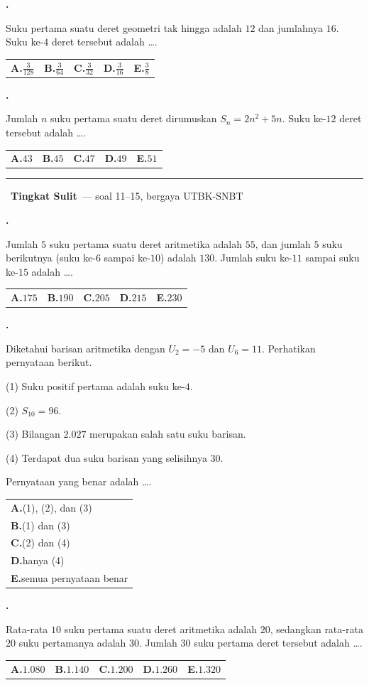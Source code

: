 \documentclass[a4paper,11pt]{article}
\newcommand{\dis}{\displaystyle}
\newcounter{no}
\newcommand{\tingkat}[2]{\par\Needspace{7\baselineskip}\vspace{0.6em}\noindent
  {\color{teal}\rule{3pt}{1.1em}}\ {\color{navy}\bfseries #1}\ {\small\color{gray}--- #2}\par\vspace{0.1em}}
\newcommand{\soal}[2]{\par\vspace{0.75em}\stepcounter{no}\noindent
  \begin{minipage}[t]{1.8em}\textbf{\theno.}\end{minipage}%
  \begin{minipage}[t]{\dimexpr\linewidth-1.8em\relax}#1\par\vspace{0.35em}#2\end{minipage}\par}
\begin{document}
\soal{Suku pertama suatu deret geometri tak hingga adalah $12$ dan jumlahnya $16$. Suku ke-$4$ deret tersebut adalah \dots.}{\begin{tabularx}{\linewidth}{@{}*{5}{X}@{}}\textbf{A.}\;$\dis\frac{3}{128}$ & \textbf{B.}\;$\dis\frac{3}{64}$ & \textbf{C.}\;$\dis\frac{3}{32}$ & \textbf{D.}\;$\dis\frac{3}{16}$ & \textbf{E.}\;$\dis\frac{3}{8}$\end{tabularx}}
\soal{Jumlah $n$ suku pertama suatu deret dirumuskan $S_n=2n^{2}+5n$. Suku ke-$12$ deret tersebut adalah \dots.}{\begin{tabularx}{\linewidth}{@{}*{5}{X}@{}}\textbf{A.}\;$43$ & \textbf{B.}\;$45$ & \textbf{C.}\;$47$ & \textbf{D.}\;$49$ & \textbf{E.}\;$51$\end{tabularx}}
\tingkat{Tingkat Sulit}{soal 11--15, bergaya UTBK-SNBT}
\soal{Jumlah $5$ suku pertama suatu deret aritmetika adalah $55$, dan jumlah $5$ suku berikutnya (suku ke-$6$ sampai ke-$10$) adalah $130$. Jumlah suku ke-$11$ sampai suku ke-$15$ adalah \dots.}{\begin{tabularx}{\linewidth}{@{}*{5}{X}@{}}\textbf{A.}\;$175$ & \textbf{B.}\;$190$ & \textbf{C.}\;$205$ & \textbf{D.}\;$215$ & \textbf{E.}\;$230$\end{tabularx}}
\soal{Diketahui barisan aritmetika dengan $U_2=-5$ dan $U_6=11$. Perhatikan pernyataan berikut.\par\smallskip\hspace*{0.3em}(1) Suku positif pertama adalah suku ke-$4$.\par\hspace*{0.3em}(2) $S_{10}=96$.\par\hspace*{0.3em}(3) Bilangan $2.027$ merupakan salah satu suku barisan.\par\hspace*{0.3em}(4) Terdapat dua suku barisan yang selisihnya $30$.\par\smallskip Pernyataan yang benar adalah \dots.}{\begin{tabularx}{\linewidth}{@{}X@{}}\textbf{A.}\;(1), (2), dan (3)\\[2pt] \textbf{B.}\;(1) dan (3)\\[2pt] \textbf{C.}\;(2) dan (4)\\[2pt] \textbf{D.}\;hanya (4)\\[2pt] \textbf{E.}\;semua pernyataan benar\end{tabularx}}
\soal{Rata-rata $10$ suku pertama suatu deret aritmetika adalah $20$, sedangkan rata-rata $20$ suku pertamanya adalah $30$. Jumlah $30$ suku pertama deret tersebut adalah \dots.}{\begin{tabularx}{\linewidth}{@{}*{5}{X}@{}}\textbf{A.}\;$1.080$ & \textbf{B.}\;$1.140$ & \textbf{C.}\;$1.200$ & \textbf{D.}\;$1.260$ & \textbf{E.}\;$1.320$\end{tabularx}}
\end{document}

